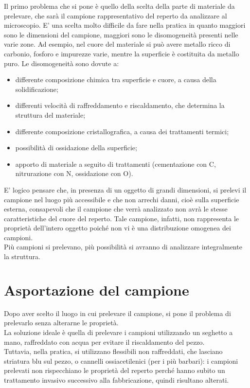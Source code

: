Il primo problema che si pone è quello della scelta della parte di materiale da prelevare, che sarà il campione rappresentativo del reperto da analizzare al microscopio.
E’ una scelta molto difficile da fare nella pratica in quanto maggiori sono le dimensioni del campione, maggiori sono le disomogeneità presenti nelle varie zone. Ad esempio, nel cuore del materiale si può avere metallo ricco di carbonio, fosforo e impurezze varie, mentre la superficie è costituita da metallo puro.
Le disomogeneità sono dovute a:
\begin{itemize}
    \item differente composizione chimica tra superficie e cuore, a causa della solidificazione;
    \item differenti velocità di raffreddamento e riscaldamento, che determina la struttura del materiale;
    \item differente composizione cristallografica, a causa dei trattamenti termici;
    \item possibilità di ossidazione della superficie;
    \item apporto di materiale a seguito di trattamenti (cementazione con C, nitrurazione con N,
ossidazione con O).
\end{itemize}

E’ logico pensare che, in presenza di un oggetto di grandi dimensioni, si prelevi il campione nel luogo più accessibile e che non arrechi danni, cioè sulla superficie esterna, consapevoli che il campione che verrà analizzato non avrà le stesse caratteristiche del cuore del reperto. Tale campione, infatti, non rappresenta le proprietà dell’intero oggetto poiché non vi è una distribuzione omogenea dei campioni.\\
Più campioni si prelevano, più possibilità si avranno di analizzare integralmente la struttura.

\section{Asportazione del campione}

Dopo aver scelto il luogo in cui prelevare il campione, si pone il problema di prelevarlo senza alterarne le proprietà.\\
La soluzione ideale è quella di prelevare i campioni utilizzando un seghetto a mano, raffreddato con acqua per evitare il riscaldamento del pezzo.\\
Tuttavia, nella pratica, si utilizzano flessibili non raffreddati, che lasciano striatura blu sul pezzo, o cannelli ossiacetilenici (per i più barbari): i campioni prelevati non rispecchiano le proprietà del reperto perché hanno subito un trattamento invasivo successivo alla fabbricazione, quindi risultano alterati.


